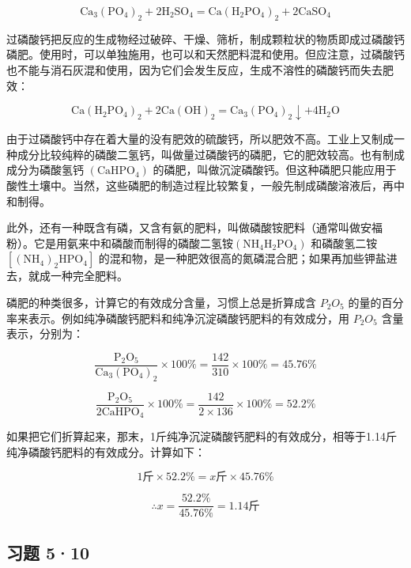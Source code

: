 \[
\mathrm{Ca} _ {3} \left(\mathrm{PO} _ {4}\right) _ {2} + 2 \mathrm{H} _ {2} \mathrm{SO} _ {4} = \mathrm{Ca} \left(\mathrm{H} _ {2} \mathrm{PO} _ {4}\right) _ {2} + 2 \mathrm{CaSO} _ {4}
\]

过磷酸钙把反应的生成物经过破碎、干燥、筛析，制成颗粒状的物质即成过磷酸钙磷肥。使用时，可以单独施用，也可以和天然肥料混和使用。但应注意，过磷酸钙也不能与消石灰混和使用，因为它们会发生反应，生成不溶性的磷酸钙而失去肥效：

\[
\mathrm{Ca} \left(\mathrm{H} _ {2} \mathrm{PO} _ {4}\right) _ {2} + 2 \mathrm{Ca} (\mathrm{OH}) _ {2} = \mathrm{Ca} _ {3} \left(\mathrm{PO} _ {4}\right) _ {2} \downarrow + 4 \mathrm{H} _ {2} \mathrm{O}
\]

由于过磷酸钙中存在着大量的没有肥效的硫酸钙，所以肥效不高。工业上又制成一种成分比较纯粹的磷酸二氢钙，叫做量过磷酸钙的磷肥，它的肥效较高。也有制成成分为磷酸氢钙
\(\left(\mathrm{CaHPO}_{4}\right)\)
的磷肥，叫做沉淀磷酸钙。但这种磷肥只能应用于酸性土壤中。当然，这些磷肥的制造过程比较繁复，一般先制成磷酸溶液后，再中和制得。

此外，还有一种既含有磷，又含有氨的肥料，叫做磷酸铵肥料（通常叫做安福粉）。它是用氨来中和磷酸而制得的磷酸二氢铵\(\left(\mathrm{NH}_{4}\mathrm{H}_{2}\mathrm{PO}_{4}\right)\)
和磷酸氢二铵
\(\left[\left(\mathrm{NH}_{4}\right)_{2}\mathrm{HPO}_{4}\right]\)
的混和物，是一种肥效很高的氮磷混合肥；如果再加些钾盐进去，就成一种完全肥料。

磷肥的种类很多，计算它的有效成分含量，习惯上总是折算成含 \(P_{2}O_{5}\)
的量的百分率来表示。例如纯净磷酸钙肥料和纯净沉淀磷酸钙肥料的有效成分，用
\(P_{2}O_{5}\) 含量表示，分别为：

\[
\frac {\mathrm{P} _ {2} \mathrm{O} _ {5}}{\mathrm{Ca} _ {3} (\mathrm{PO} _ {4}) _ {2}} \times 100 \% = \frac {142}{310} \times 100 \% = 45.76 \%
\]

\[
\frac {\mathrm{P} _ {2} \mathrm{O} _ {5}}{2 \mathrm{CaHPO} _ {4}} \times 100 \% = \frac {142}{2 \times 136} \times 100 \% = 52.2 \%
\]

如果把它们折算起来，那末，1斤纯净沉淀磷酸钙肥料的有效成分，相等于1.14斤纯净磷酸钙肥料的有效成分。计算如下：

\[
1 \text{斤} \times 52.2\% = x \text{斤} \times 45.76\%
\]

\[
\therefore x = \frac {52.2\%}{45.76\%} = 1.14 \text{斤}
\]

\subsection{习题 5·10}

